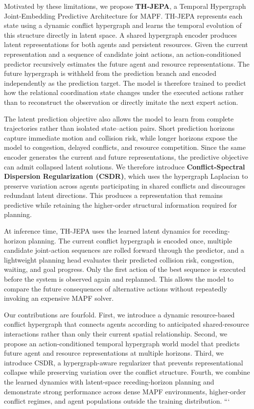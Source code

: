 \documentclass{article} %
\begin{document}
Motivated by these limitations, we propose \textbf{TH-JEPA}, a Temporal Hypergraph Joint-Embedding Predictive Architecture for MAPF. TH-JEPA represents each state using a dynamic conflict hypergraph and learns the temporal evolution of this structure directly in latent space. A shared hypergraph encoder produces latent representations for both agents and persistent resources. Given the current representation and a sequence of candidate joint actions, an action-conditioned predictor recursively estimates the future agent and resource representations. The future hypergraph is withheld from the prediction branch and encoded independently as the prediction target. The model is therefore trained to predict how the relational coordination state changes under the executed actions rather than to reconstruct the observation or directly imitate the next expert action.

The latent prediction objective also allows the model to learn from complete trajectories rather than isolated state--action pairs. Short prediction horizons capture immediate motion and collision risk, while longer horizons expose the model to congestion, delayed conflicts, and resource competition. Since the same encoder generates the current and future representations, the predictive objective can admit collapsed latent solutions. We therefore introduce \textbf{Conflict-Spectral Dispersion Regularization (CSDR)}, which uses the hypergraph Laplacian to preserve variation across agents participating in shared conflicts and discourages redundant latent directions. This produces a representation that remains predictive while retaining the higher-order structural information required for planning.

At inference time, TH-JEPA uses the learned latent dynamics for receding-horizon planning. The current conflict hypergraph is encoded once, multiple candidate joint-action sequences are rolled forward through the predictor, and a lightweight planning head evaluates their predicted collision risk, congestion, waiting, and goal progress. Only the first action of the best sequence is executed before the system is observed again and replanned. This allows the model to compare the future consequences of alternative actions without repeatedly invoking an expensive MAPF solver.

Our contributions are fourfold. First, we introduce a dynamic resource-based conflict hypergraph that connects agents according to anticipated shared-resource interactions rather than only their current spatial relationship. Second, we propose an action-conditioned temporal hypergraph world model that predicts future agent and resource representations at multiple horizons. Third, we introduce CSDR, a hypergraph-aware regularizer that prevents representational collapse while preserving variation over the conflict structure. Fourth, we combine the learned dynamics with latent-space receding-horizon planning and demonstrate strong performance across dense MAPF environments, higher-order conflict regimes, and agent populations outside the training distribution.
```
\end{document}
